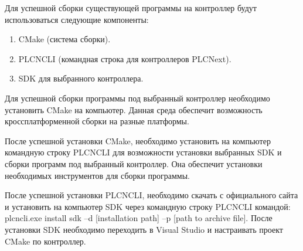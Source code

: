 Для успешной сборки существующей программы на контроллер будут использоваться следующие компоненты:

\begin{enumerate}
	\item CMake (система сборки).
	\item PLCNCLI (командная строка для контроллеров PLCNext).
	\item SDK для выбранного контроллера.	
\end{enumerate}

Для успешной сборки программы под выбранный контроллер необходимо установить CMake на компьютер. Данная среда обеспечит возможность кроссплатформенной сборки на разные платформы.

После успешной установки CMake, необходимо установить на компьютер командную строку PLCNCLI для возможности установки выбранных SDK и сборки программ под выбранный контроллер. Она обеспечит установки необходимых инструментов для сборки программы.

После успешной установки PLCNCLI, необходимо скачать с официального сайта и установить на компьютер SDK через командную строку PLCNCLI командой: plcncli.exe install sdk –d [installation path] –p [path to archive file].  После установки SDK необходимо переходить в Visual Studio и настраивать проект CMake по контроллер.
	